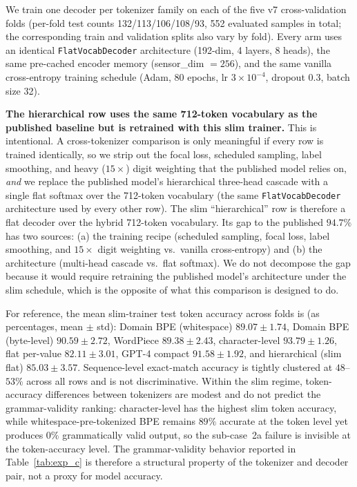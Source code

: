 \documentclass[sensors,article,submit,moreauthors,pdftex]{Definitions/mdpi}
\begin{document}
We train one decoder per tokenizer family on each of the five v7 cross-validation folds (per-fold test counts 132/113/106/108/93, 552 evaluated samples in total; the corresponding train and validation splits also vary by fold). Every arm uses an identical \texttt{FlatVocabDecoder} architecture (192-dim, 4 layers, 8 heads), the same pre-cached encoder memory (sensor\_dim $= 256$), and the same vanilla cross-entropy training schedule (Adam, 80 epochs, lr $3{\times}10^{-4}$, dropout 0.3, batch size 32).

\textbf{The hierarchical row uses the same 712-token vocabulary as the published baseline but is retrained with this slim trainer.} This is intentional. A cross-tokenizer comparison is only meaningful if every row is trained identically, so we strip out the focal loss, scheduled sampling, label smoothing, and heavy ($15\times$) digit weighting that the published model relies on, \emph{and} we replace the published model's hierarchical three-head cascade with a single flat softmax over the 712-token vocabulary (the same \texttt{FlatVocabDecoder} architecture used by every other row). The slim ``hierarchical'' row is therefore a flat decoder over the hybrid 712-token vocabulary. Its gap to the published $94.7\%$ has two sources: (a) the training recipe (scheduled sampling, focal loss, label smoothing, and $15\times$ digit weighting vs.\ vanilla cross-entropy) and (b) the architecture (multi-head cascade vs.\ flat softmax). We do not decompose the gap because it would require retraining the published model's architecture under the slim schedule, which is the opposite of what this comparison is designed to do.

For reference, the mean slim-trainer test token accuracy across folds is (as percentages, mean $\pm$ std): Domain BPE (whitespace) $89.07 \pm 1.74$, Domain BPE (byte-level) $90.59 \pm 2.72$, WordPiece $89.38 \pm 2.43$, character-level $93.79 \pm 1.26$, flat per-value $82.11 \pm 3.01$, GPT-4 compact $91.58 \pm 1.92$, and hierarchical (slim flat) $85.03 \pm 3.57$. Sequence-level exact-match accuracy is tightly clustered at $48$--$53\%$ across all rows and is not discriminative. Within the slim regime, token-accuracy differences between tokenizers are modest and do not predict the grammar-validity ranking: character-level has the highest slim token accuracy, while whitespace-pre-tokenized BPE remains $89\%$ accurate at the token level yet produces $0\%$ grammatically valid output, so the sub-case~2a failure is invisible at the token-accuracy level. The grammar-validity behavior reported in Table~\ref{tab:exp_c} is therefore a structural property of the tokenizer and decoder pair, not a proxy for model accuracy.
\end{document}
